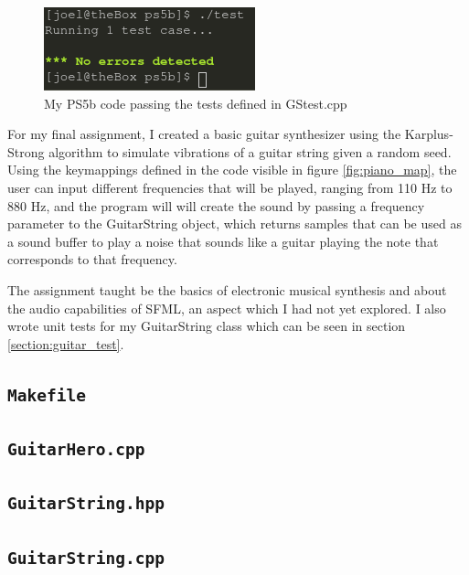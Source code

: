 \documentclass[12pt]{article}
\begin{document}
\begin{figure}
\includegraphics[scale=0.6]{../ps5b/passes.png}
\centering
\caption{My PS5b code passing the tests defined in GStest.cpp}
\end{figure}

For my final assignment, I created a basic guitar synthesizer using the Karplus-Strong algorithm to simulate vibrations of a guitar string given a random seed. Using the keymappings defined in the code visible in figure \ref{fig:piano_map}, the user can input different frequencies that will be played, ranging from 110 Hz to 880 Hz, and the program will will create the sound by passing a frequency parameter to the GuitarString object, which returns samples that can be used as a sound buffer to play a noise that sounds like a guitar playing the note that corresponds to that frequency.

The assignment taught be the basics of electronic musical synthesis and about the audio capabilities of SFML, an aspect which I had not yet explored. I also wrote unit tests for my GuitarString class which can be seen in section \ref{section:guitar_test}.

\subsection{\texttt{Makefile}}



\subsection{\texttt{GuitarHero.cpp}}



\subsection{\texttt{GuitarString.hpp}}



\subsection{\texttt{GuitarString.cpp}}
\end{document}
